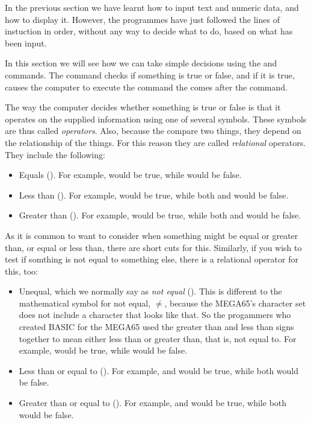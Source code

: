 In the previous section we have learnt how to input text and numeric
data, and how to display it.  However, the programmes have just
followed the lines of instuction in order, without any way to decide
what to do, based on what has been input.

In this section we will see how we can take simple decisions using the
 and
 commands.
The  command checks if something is true or false, and if it
is true, causes the computer to execute the command the comes after
the  command.

The way the computer decides whether something is true or false is
that it operates on the supplied information using one of several
symbols. These symbols are thus called {\em operators}.  Also, because
the compare two things, they depend on the relationship of the
things.  For this reason they are called {\em relational}
operators.
They include the following:

\begin{itemize}
  \item Equals (\stw{=}). For example,  would be true,
    while  would be false.
  \item Less than (\stw{<}). For example,  would be true,
    while both  and  would be false.
  \item Greater than (\stw{>}). For example,  would be
    true, while both  and  would be false.
\end{itemize}

As it is common to want to consider when something might be equal or
greater than, or equal or less than, there are short cuts for
this. Similarly, if you wish to test if somthing is not equal to
something else, there is a relational operator for this, too:

\begin{itemize}
\item Unequal, which we normally say as {\em not equal}
  (\stw{<>}). This is different to the mathematical symbol for not
  equal, $\ne$, because the MEGA65's character set does not include a
  character that looks like that. So the progammers who created BASIC
  for the MEGA65 used the greater than and less than signs together
  to mean either less than or greater than, that is, not equal to.
  For example,  would be true,
    while  would be false.
  \item Less than or equal to (\stw{<=}). For example,  and
     would be true,
    while both  would be false.
  \item Greater than or equal to (\stw{>=}). For example, 
    and  would be
    true, while both  would be false.
\end{itemize}

